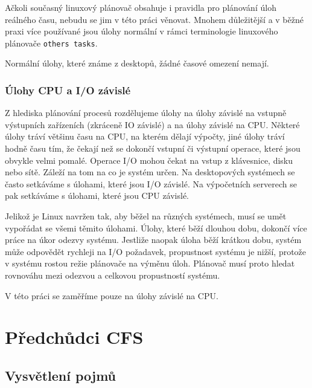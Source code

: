 \documentclass[
  master=true,
  font=sans,
  printversion=false,
  joinlists=true,
  figures=true,
  tables=true,
  sourcecodes=false,
  theorems=false,
  bibencoding=utf8,
  language=czech,
  encoding=utf8,
  field=ainfk,
  biblatex,
  glossaries,
  index
]{kidiplom}
\begin{document}
Ačkoli současný linuxový plánovač obsahuje i pravidla pro plánování úloh reálného času, nebudu se jim v této práci věnovat. Mnohem důležitější a v běžné praxi více používané jsou úlohy normální v rámci terminologie linuxového plánovače \verb#others tasks#.

Normální úlohy, které známe z desktopů, žádné časové omezení nemají.

\subsubsection{Úlohy CPU a I/O závislé}

Z hlediska plánování procesů rozdělujeme úlohy na úlohy závislé na vstupně výstupních zařízeních (zkráceně IO závislé) a na úlohy závislé na CPU. Některé úlohy tráví většinu času na CPU, na kterém dělají výpočty, jiné úlohy tráví hodně času tím, že čekají než se dokončí vstupní či výstupní operace, které jsou obvykle velmi pomalé. Operace I/O mohou čekat na vstup z klávesnice, disku nebo sítě. 
Záleží na tom na co je systém určen. Na desktopových systémech se často setkáváme s úlohami, které jsou I/O závislé. Na výpočetních serverech se pak setkáváme s úlohami, které jsou CPU závislé. 

Jelikož je Linux navržen tak, aby běžel na různých systémech, musí se umět vypořádat se všemi těmito úlohami. Úlohy, které běží dlouhou dobu, dokončí více práce na úkor odezvy systému. Jestliže naopak úloha běží krátkou dobu, systém může odpovědět rychleji na I/O požadavek, propustnost systému je nižší, protože v systému rostou režie plánovače na výměnu úloh. Plánovač musí proto hledat rovnováhu mezi odezvou a celkovou propustností systému. 

V této práci se zaměříme pouze na úlohy závislé na CPU.

\section{Předchůdci CFS}

\subsection{Vysvětlení pojmů}

\noindent
 
\end{document}
